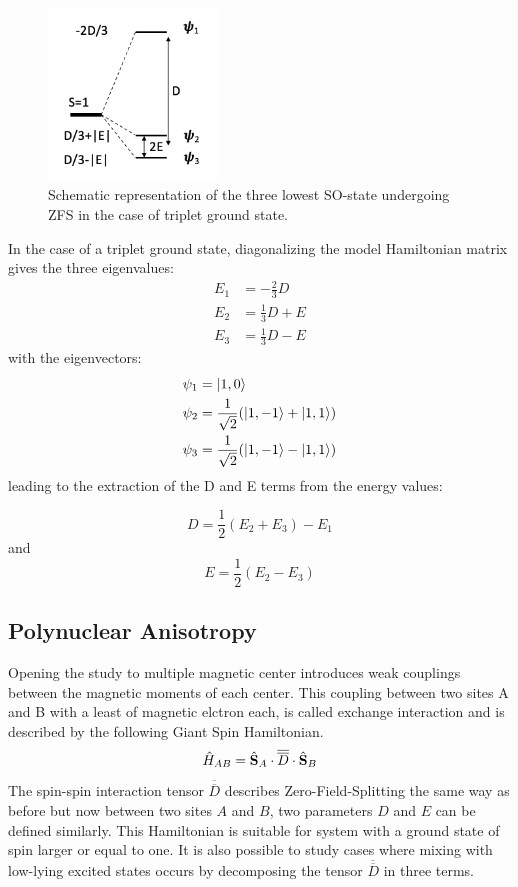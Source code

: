 \documentclass[10pt]{report}
\numberwithin{equation}{section}
\begin{document}
\begin{figure}
    \centering
    \includegraphics[width=0.4\textwidth]{Images/SpectreZFS.png}
    \caption{Schematic representation of the three lowest SO-state undergoing ZFS in the case of triplet ground state.}
    \label{SpectreZFS}
\end{figure}
In the case of a triplet ground state, diagonalizing the model Hamiltonian matrix gives the three eigenvalues:
\begin{align}
    E_1&=-\frac{2}{3}D\\
    E_2&=\frac{1}{3}D+E\\
    E_3&=\frac{1}{3}D-E
\end{align}
with the eigenvectors:
\begin{align}
    \psi_1&=\ket{1,0}\\
    \psi_2&=\frac{1}{\sqrt{2}}(\ket{1,-1}+\ket{1,1})\\
    \psi_3&=\frac{1}{\sqrt{2}}(\ket{1,-1}-\ket{1,1})
\end{align}
leading to the extraction of the D and E terms from the energy values:

\begin{equation}
    D=\frac{1}{2}(E_2+E_3)-E_1
\end{equation}
and
\begin{equation}
    E=\frac{1}{2}(E_2-E_3)
\end{equation}



\subsection{Polynuclear Anisotropy}
Opening the study to multiple magnetic center introduces weak couplings between the magnetic moments of each center. 
This coupling between two sites A and B with a least of magnetic elctron each, is called exchange interaction and is described by the following Giant Spin Hamiltonian.
\begin{equation}
    \hat{H}_{AB}=\hat{\vb S}_A\cdot \overline{\overline{D}} \cdot \hat{\vb S}_B
\end{equation}
The spin-spin interaction tensor $\overline{\overline{D}}$ describes Zero-Field-Splitting the same way as before but now between two sites $A$ and $B$, two parameters $D$ and $E$ can be defined similarly. 
This Hamiltonian is suitable for system with a ground state of spin larger or equal to one.
It is also possible to study cases where mixing with low-lying excited states occurs by decomposing the tensor $\overline{\overline{D}}$ in three terms.
\end{document}
